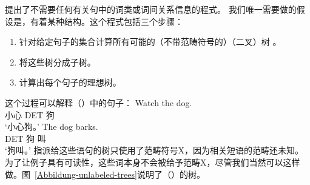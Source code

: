 \mbox{}\citet{Bod2009a}提出了不需要任何有关句中的词类或词间关系信息的程式。
我们唯一需要做的假设是，有着某种结构。这个程式包括三个步骤：
\begin{enumerate}
\item 针对给定句子的集合计算所有可能的（不带范畴符号的）（二叉）树 。
\item 将这些树分成子树。
\item 计算出每个句子的理想树。
\end{enumerate}
这个过程可以解释（）中的句子：
\eal
\ex 
\gll Watch the dog.\\
小心 DET 狗\\
\glt `小心狗。'
\ex 
\gll The dog barks.\\
DET 狗 叫\\
\glt `狗叫。'
\zl
指派给这些语句的树只使用了范畴符号X，因为相关短语的范畴还未知。为了让例子具有可读性，这些词本身不会被给予范畴X，尽管我们当然可以这样做。图~\vref{Abbildung-unlabeled-trees}说明了（）的树。
